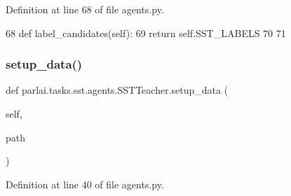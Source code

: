 Definition at line 68 of file agents.\+py.


\begin{DoxyCode}
68     \textcolor{keyword}{def }label\_candidates(self):
69         \textcolor{keywordflow}{return} self.SST\_LABELS
70 
71 
\end{DoxyCode}
\mbox{\label{classparlai_1_1tasks_1_1sst_1_1agents_1_1SSTTeacher_a04ac8a501eb6bc95310e9b72b2f4091c}} 
\subsubsection{\texorpdfstring{setup\+\_\+data()}{setup\_data()}}
{\footnotesize\ttfamily def parlai.\+tasks.\+sst.\+agents.\+S\+S\+T\+Teacher.\+setup\+\_\+data (\begin{DoxyParamCaption}\item[{}]{self,  }\item[{}]{path }\end{DoxyParamCaption})}



Definition at line 40 of file agents.\+py.



